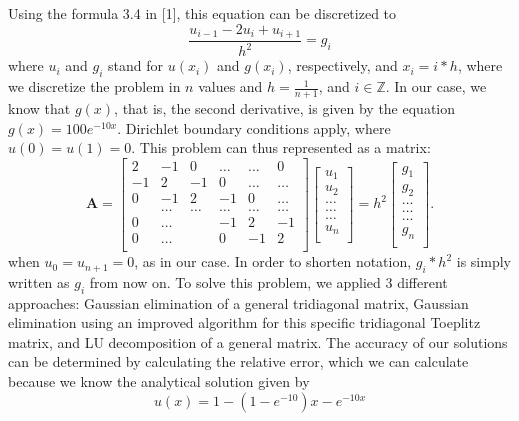 \documentclass[10pt,a4paper]{article}
\begin{document}
Using the formula 3.4 in [1], this equation can be discretized to 
$$\frac{u_{i-1}-2u_{i}+u_{i+1}}{h^2} = g_{i}$$
where $u_{i}$ and $g_{i}$ stand for $u(x_{i})$ and $g(x_{i})$, respectively, and $x_{i}=i*h$, where we discretize the problem in $n$ values and  $h=\frac{1}{n+1}$, and $i  \in  \mathbb{Z}$.
In our case, we know that $g(x)$, that is, the second derivative, is given by the equation $g(x) = 100e^{-10x}$. Dirichlet boundary conditions apply, where $u(0)=u(1)=0$.
This problem can thus represented as a matrix:
\[
    \mathbf{A} = \begin{bmatrix}
                           2& -1& 0 &\dots   & \dots &0 \\
                           -1 & 2 & -1 &0 &\dots &\dots \\
                           0&-1 &2 & -1 & 0 & \dots \\
                           & \dots   & \dots &\dots   &\dots & \dots \\
                           0&\dots   &  &-1 &2& -1 \\
                           0&\dots    &  & 0  &-1 & 2 \\
                      \end{bmatrix}\begin{bmatrix}
                           u_1\\
                           u_2\\
                           \dots \\
                          \dots  \\
                          \dots \\
                           u_n\\
                      \end{bmatrix}
  =h^2
\begin{bmatrix}
                           {g}_1\\
                           {g}_2\\
                           \dots \\
                           \dots \\
                          \dots \\
                           {g}_n\\
                      \end{bmatrix}.
\]
when $u_{0}=u_{n+1}=0$, as in our case. In order to shorten notation, $g_i*h^2$ is simply written as  $g_i$ from now on.
To solve this problem, we applied 3 different approaches: Gaussian elimination of a general tridiagonal matrix, Gaussian elimination using an improved algorithm for this specific tridiagonal Toeplitz matrix, and LU decomposition of a general matrix. The accuracy of our solutions can be determined by calculating the relative error, which we can calculate because we know the analytical solution given by 
$$u(x)=1-(1-e^{-10})x-e^{-10x}$$
\end{document}

